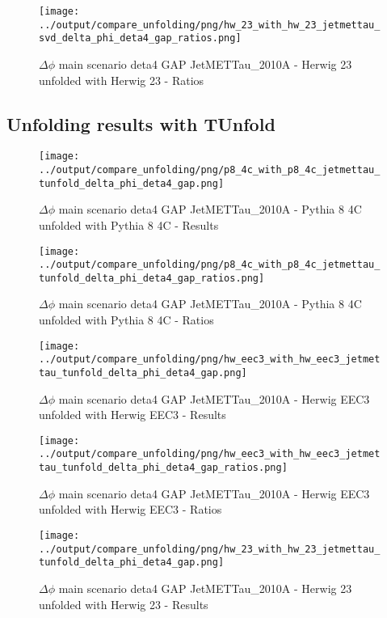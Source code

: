 \documentclass[11pt]{book}
\begin{document}
\begin{figure}[ht]
\centering
\texttt{[image: ../output/compare\_unfolding/png/hw\_23\_with\_hw\_23\_jetmettau\_svd\_delta\_phi\_deta4\_gap\_ratios.png]}
\caption{$\Delta\phi$ main scenario deta4 GAP JetMETTau\_2010A - Herwig 23 unfolded with Herwig 23 - Ratios}
\label{hw_23_hw_23_jetmettau_svd_delta_phi_deta4_gap_b}
\end{figure}


\clearpage
\subsection{Unfolding results with TUnfold}

\begin{figure}[ht]
\centering
\texttt{[image: ../output/compare\_unfolding/png/p8\_4c\_with\_p8\_4c\_jetmettau\_tunfold\_delta\_phi\_deta4\_gap.png]}
\caption{$\Delta\phi$ main scenario deta4 GAP JetMETTau\_2010A - Pythia 8 4C unfolded with Pythia 8 4C - Results}
\label{p8_p8_jetmettau_tunfold_delta_phi_deta4_gap_a}
\end{figure}

\begin{figure}[ht]
\centering
\texttt{[image: ../output/compare\_unfolding/png/p8\_4c\_with\_p8\_4c\_jetmettau\_tunfold\_delta\_phi\_deta4\_gap\_ratios.png]}
\caption{$\Delta\phi$ main scenario deta4 GAP JetMETTau\_2010A - Pythia 8 4C unfolded with Pythia 8 4C - Ratios}
\label{p8_p8_jetmettau_tunfold_delta_phi_deta4_gap_b}
\end{figure}

\begin{figure}[ht]
\centering
\texttt{[image: ../output/compare\_unfolding/png/hw\_eec3\_with\_hw\_eec3\_jetmettau\_tunfold\_delta\_phi\_deta4\_gap.png]}
\caption{$\Delta\phi$ main scenario deta4 GAP JetMETTau\_2010A - Herwig EEC3 unfolded with Herwig EEC3 - Results}
\label{hw_eec3_hw_eec3_jetmettau_tunfold_delta_phi_deta4_gap_a}
\end{figure}

\begin{figure}[ht]
\centering
\texttt{[image: ../output/compare\_unfolding/png/hw\_eec3\_with\_hw\_eec3\_jetmettau\_tunfold\_delta\_phi\_deta4\_gap\_ratios.png]}
\caption{$\Delta\phi$ main scenario deta4 GAP JetMETTau\_2010A - Herwig EEC3 unfolded with Herwig EEC3 - Ratios}
\label{hw_eec3_hw_eec3_jetmettau_tunfold_delta_phi_deta4_gap_b}
\end{figure}

\begin{figure}[ht]
\centering
\texttt{[image: ../output/compare\_unfolding/png/hw\_23\_with\_hw\_23\_jetmettau\_tunfold\_delta\_phi\_deta4\_gap.png]}
\caption{$\Delta\phi$ main scenario deta4 GAP JetMETTau\_2010A - Herwig 23 unfolded with Herwig 23 - Results}
\label{hw_23_hw_23_jetmettau_tunfold_delta_phi_deta4_gap_a}
\end{figure}
\end{document}
